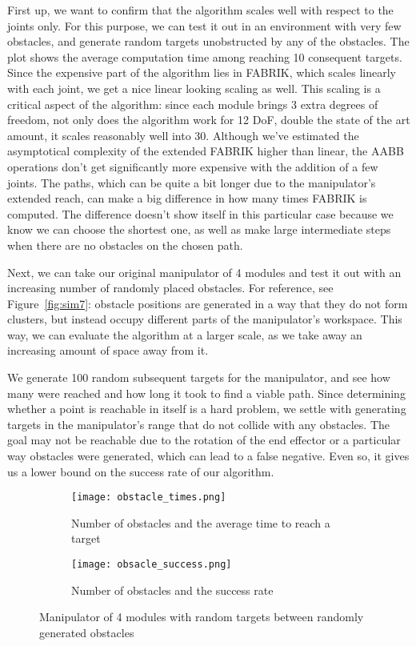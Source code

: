 First up, we want to confirm that the algorithm scales well with respect to the joints only. For this purpose, we can test it out in an environment with very few obstacles, and generate random targets unobstructed by any of the obstacles. The plot shows the average computation time among reaching 10 consequent targets. Since the expensive part of the algorithm lies in FABRIK, which scales linearly with each joint, we get a nice linear looking scaling as well. This scaling is a critical aspect of the algorithm: since each module brings 3 extra degrees of freedom, not only does the algorithm work for 12 DoF, double the state of the art amount, it scales reasonably well into 30. Although we've estimated the asymptotical complexity of the extended FABRIK higher than linear, the AABB operations don't get significantly more expensive with the addition of a few joints.
The paths, which can be quite a bit longer due to the manipulator's extended reach, can make a big difference in how many times FABRIK is computed. The difference doesn't show itself in this particular case because we know we can choose the shortest one, as well as make large intermediate steps when there are no obstacles on the chosen path.


Next, we can take our original manipulator of 4 modules and test it out with an increasing number of randomly placed obstacles. For reference, see Figure~\ref{fig:sim7}: obstacle positions are generated in a way that they do not form clusters, but instead occupy different parts of the manipulator's workspace. This way, we can evaluate the algorithm at a larger scale, as we take away an increasing amount of space away from it.

We generate 100 random subsequent targets for the manipulator, and see how many were reached and how long it took to find a viable path. Since determining whether a point is reachable in itself is a hard problem, we settle with generating targets in the manipulator's range that do not collide with any obstacles. The goal may not be reachable due to the rotation of the end effector or a particular way obstacles were generated, which can lead to a false negative. Even so, it gives us a lower bound on the success rate of our algorithm.

\begin{figure}
  \centering
  \begin{subfigure}{.45\textwidth}
    \texttt{[image: obstacle\_times.png]}
    \caption{Number of obstacles and the average time to reach a target}
  \end{subfigure}
  \begin{subfigure}{0.45\textwidth}
    \texttt{[image: obsacle\_success.png]}
    \caption{Number of obstacles and the success rate}
  \end{subfigure}

  \caption{Manipulator of 4 modules with random targets between randomly generated obstacles}\label{fig:inc_obst}
\end{figure}

